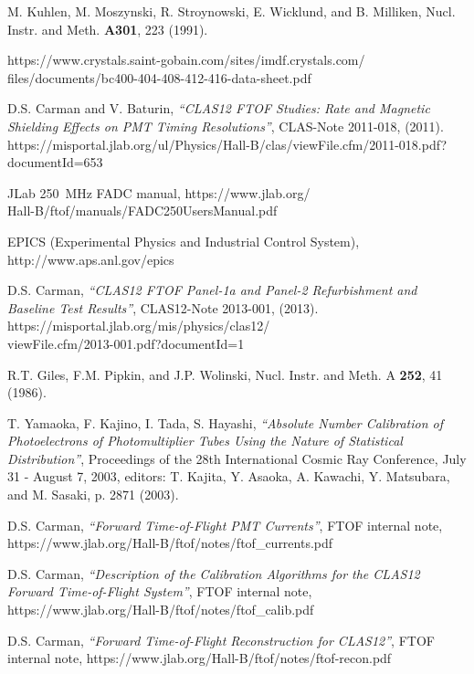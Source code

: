 \documentclass[3p,times,twocolumn]{elsarticle}
\begin{document}
\begin{thebibliography}{99}
M. Kuhlen, M. Moszynski, R. Stroynowski, E. Wicklund, and B. Milliken, Nucl.  Instr. and Meth.
{\bf A301}, 223 (1991).

https://www.crystals.saint-gobain.com/sites/imdf.crystals.com/\\
files/documents/bc400-404-408-412-416-data-sheet.pdf

D.S. Carman and V. Baturin, {\it ``CLAS12 FTOF Studies: Rate and Magnetic Shielding Effects on PMT Timing
Resolutions''}, CLAS-Note 2011-018, (2011).\\
https://misportal.jlab.org/ul/Physics/Hall-B/clas/viewFile.cfm/2011-018.pdf?documentId=653

JLab 250~MHz FADC manual, https://www.jlab.org/\\ Hall-B/ftof/manuals/FADC250UsersManual.pdf
  
EPICS (Experimental Physics and Industrial Control System),\\ http://www.aps.anl.gov/epics

D.S. Carman, {\it ``CLAS12 FTOF Panel-1a and Panel-2 Refurbishment and Baseline Test Results''},
CLAS12-Note 2013-001, (2013).\\
https://misportal.jlab.org/mis/physics/clas12/\\ viewFile.cfm/2013-001.pdf?documentId=1

R.T. Giles, F.M. Pipkin, and J.P. Wolinski, Nucl. Instr. and Meth. A {\bf 252}, 41 (1986).

T. Yamaoka, F. Kajino, I. Tada, S. Hayashi, {\it ``Absolute Number Calibration of Photoelectrons of
Photomultiplier Tubes Using the Nature of Statistical Distribution''}, Proceedings of the 28th International
Cosmic Ray Conference, July 31 - August 7, 2003, editors: T. Kajita, Y. Asaoka, A. Kawachi, Y. Matsubara, and
M. Sasaki, p. 2871 (2003).

D.S. Carman, {\it ``Forward Time-of-Flight PMT Currents''}, FTOF internal note, 
https://www.jlab.org/Hall-B/ftof/notes/ftof\_currents.pdf

D.S. Carman, {\it ``Description of the Calibration Algorithms for the CLAS12 Forward Time-of-Flight System''},
FTOF internal note, \\
https://www.jlab.org/Hall-B/ftof/notes/ftof\_calib.pdf

D.S. Carman, {\it ``Forward Time-of-Flight Reconstruction for CLAS12''}, FTOF internal note, 
https://www.jlab.org/Hall-B/ftof/notes/ftof-recon.pdf


\end{thebibliography}
\end{document}
